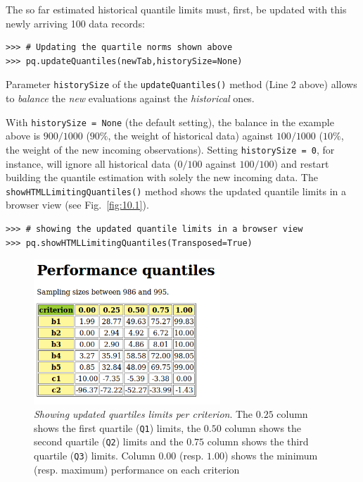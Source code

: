 The so far estimated historical quantile limits must, first, be updated with this newly arriving 100 data records:
\begin{lstlisting}
>>> # Updating the quartile norms shown above 
>>> pq.updateQuantiles(newTab,historySize=None)
\end{lstlisting}
Parameter \texttt{historySize} of the \texttt{updateQuantiles()} method (Line 2 above) allows to \emph{balance} the \emph{new} evaluations against the \emph{historical} ones.

With \texttt{historySize = None} (the default setting), the balance in the example above is $900/1000$ ($90\%$, the weight of historical data) against $100/1000$ ($10\%$, the weight of the new incoming observations). Setting \texttt{historySize = 0}, for instance, will ignore all historical data ($0/100$ against $100/100$) and restart building the quantile estimation with solely the new incoming data. The \texttt{showHTMLLimitingQuantiles()} method shows the updated quantile limits in a browser view (see Fig.~\vref{fig:10.1}).
\begin{lstlisting}
>>> # showing the updated quantile limits in a browser view
>>> pq.showHTMLLimitingQuantiles(Transposed=True)
\end{lstlisting}
\begin{figure}[ht]
\sidecaption[t]
\includegraphics[width=7cm]{Figures/10-1-examplePerfQuantiles.png}
\caption[Showing updated quartiles limits per criterion]{\emph{Showing updated quartiles limits per criterion}. The $0.25$ column shows the first quartile (\texttt{Q1}) limits, the $0.50$ column shows the second quartile (\texttt{Q2}) limits and the $0.75$ column shows the third quartile (\texttt{Q3}) limits. Column $0.00$ (resp. $1.00$) shows the minimum (resp. maximum) performance on each criterion}
\label{fig:10.1}       %
\end{figure}
    
